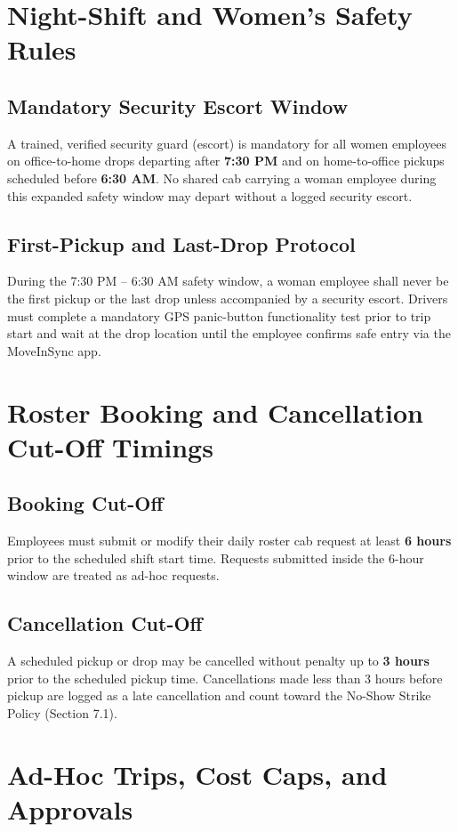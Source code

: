 \documentclass[11pt,a4paper]{article}
\begin{document}
\section{Night-Shift and Women's Safety Rules}
\subsection{Mandatory Security Escort Window}
A trained, verified security guard (escort) is mandatory for all women employees on office-to-home drops departing after \textbf{7:30 PM} and on home-to-office pickups scheduled before \textbf{6:30 AM}. No shared cab carrying a woman employee during this expanded safety window may depart without a logged security escort.

\subsection{First-Pickup and Last-Drop Protocol}
During the 7:30 PM -- 6:30 AM safety window, a woman employee shall never be the first pickup or the last drop unless accompanied by a security escort. Drivers must complete a mandatory GPS panic-button functionality test prior to trip start and wait at the drop location until the employee confirms safe entry via the MoveInSync app.

\section{Roster Booking and Cancellation Cut-Off Timings}
\subsection{Booking Cut-Off}
Employees must submit or modify their daily roster cab request at least \textbf{6 hours} prior to the scheduled shift start time. Requests submitted inside the 6-hour window are treated as ad-hoc requests.

\subsection{Cancellation Cut-Off}
A scheduled pickup or drop may be cancelled without penalty up to \textbf{3 hours} prior to the scheduled pickup time. Cancellations made less than 3 hours before pickup are logged as a late cancellation and count toward the No-Show Strike Policy (Section 7.1).

\section{Ad-Hoc Trips, Cost Caps, and Approvals}
\end{document}
